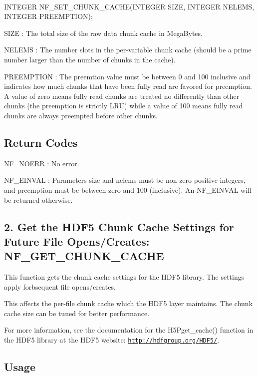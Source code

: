  

I\+N\+T\+E\+G\+ER N\+F\+\_\+\+S\+E\+T\+\_\+\+C\+H\+U\+N\+K\+\_\+\+C\+A\+C\+H\+E(\+I\+N\+T\+E\+G\+E\+R S\+I\+Z\+E, I\+N\+T\+E\+G\+E\+R N\+E\+L\+E\+M\+S, I\+N\+T\+E\+G\+E\+R P\+R\+E\+E\+M\+P\+T\+I\+O\+N);

{\ttfamily S\+I\+ZE} \+: The total size of the raw data chunk cache in Mega\+Bytes.

{\ttfamily N\+E\+L\+E\+MS} \+: The number slots in the per-\/variable chunk cache (should be a prime number larger than the number of chunks in the cache).

{\ttfamily P\+R\+E\+E\+M\+P\+T\+I\+ON} \+: The preemtion value must be between 0 and 100 inclusive and indicates how much chunks that have been fully read are favored for preemption. A value of zero means fully read chunks are treated no differently than other chunks (the preemption is strictly L\+RU) while a value of 100 means fully read chunks are always preempted before other chunks.

\subsection*{Return Codes }

{\ttfamily N\+F\+\_\+\+N\+O\+E\+RR} \+: No error.

{\ttfamily N\+F\+\_\+\+E\+I\+N\+V\+AL} \+: Parameters size and nelems must be non-\/zero positive integers, and preemption must be between zero and 100 (inclusive). An N\+F\+\_\+\+E\+I\+N\+V\+AL will be returned otherwise.\hypertarget{nc_f77_interface_guide_f77_NF-GET-CHUNK-CACHE}{}\subsection{2. Get the H\+D\+F5 Chunk Cache Settings for Future File Opens/\+Creates\+: N\+F\+\_\+\+G\+E\+T\+\_\+\+C\+H\+U\+N\+K\+\_\+\+C\+A\+C\+H\+E }\label{nc_f77_interface_guide_f77_NF-GET-CHUNK-CACHE}
This function gets the chunk cache settings for the H\+D\+F5 library. The settings apply forbsequent file opens/creates.

This affects the per-\/file chunk cache which the H\+D\+F5 layer maintains. The chunk cache size can be tuned for better performance.

For more information, see the documentation for the H5\+Pget\+\_\+cache() function in the H\+D\+F5 library at the H\+D\+F5 website\+: \href{http://hdfgroup.org/HDF5/}{\tt http\+://hdfgroup.\+org/\+H\+D\+F5/}.

\subsection*{Usage }

